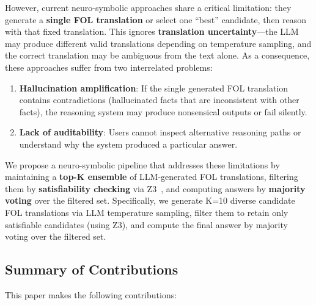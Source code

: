 \documentclass[11pt,letterpaper]{article}
\begin{document}
However, current neuro-symbolic approaches share a critical limitation: they generate a \textbf{single FOL translation} or select one ``best'' candidate, then reason with that fixed translation. This ignores \textbf{translation uncertainty}---the LLM may produce different valid translations depending on temperature sampling, and the correct translation may be ambiguous from the text alone. As a consequence, these approaches suffer from two interrelated problems:

\begin{enumerate}
    \item \textbf{Hallucination amplification}: If the single generated FOL translation contains contradictions (hallucinated facts that are inconsistent with other facts), the reasoning system may produce nonsensical outputs or fail silently.
    
    \item \textbf{Lack of auditability}: Users cannot inspect alternative reasoning paths or understand why the system produced a particular answer.
\end{enumerate}

We propose a neuro-symbolic pipeline that addresses these limitations by maintaining a \textbf{top-K ensemble} of LLM-generated FOL translations, filtering them by \textbf{satisfiability checking} via Z3~\cite{DeMoura2008}, and computing answers by \textbf{majority voting} over the filtered set. Specifically, we generate K=10 diverse candidate FOL translations via LLM temperature sampling, filter them to retain only satisfiable candidates (using Z3), and compute the final answer by majority voting over the filtered set.

\subsection{Summary of Contributions}

This paper makes the following contributions:
\end{document}
